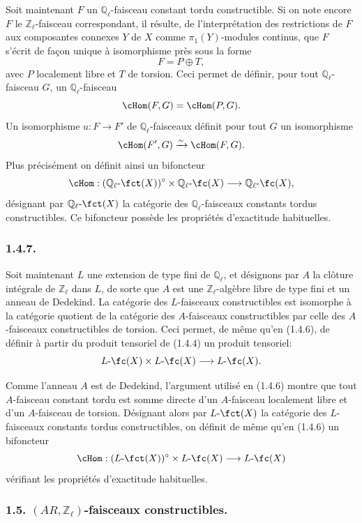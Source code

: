 Soit maintenant \(F\) un \(\mathbb{Q}_\ell\)-faisceau constant tordu constructible. Si on note encore \(F\) le \(\mathbb{Z}_\ell\)-faisceau correspondant, il résulte, de l'interprétation des restrictions de \(F\) aux composantes connexes \(Y\) de \(X\) comme \(\pi_1(Y)\)-modules continus, que \(F\) s'écrit de façon unique à isomorphisme près sous la forme
\[
F=P\oplus T,
\]
avec \(P\) localement libre et \(T\) de torsion. Ceci permet de définir, pour tout \(\mathbb{Q}_\ell\)-faisceau \(G\), un \(\mathbb{Q}_\ell\)-faisceau
\[
\cHom(F,G)=\cHom(P,G).
\]
Un isomorphisme \(u:F\to F'\) de \(\mathbb{Q}_\ell\)-faisceaux définit pour tout \(G\) un isomorphisme
\[
\cHom(F',G)\xrightarrow{\sim}\cHom(F,G).
\]
Plus précisément on définit ainsi un bifoncteur
\[
\cHom:(\mathbb{Q}_\ell\text{-}\fct(X))^\circ\times \mathbb{Q}_\ell\text{-}\fc(X)
\longrightarrow \mathbb{Q}_\ell\text{-}\fc(X),
\]
désignant par \(\mathbb{Q}_\ell\text{-}\fct(X)\) la catégorie des \(\mathbb{Q}_\ell\)-faisceaux constants tordus constructibles. Ce bifoncteur possède les propriétés d'exactitude habituelles.

\subsubsection*{1.4.7.}
Soit maintenant \(L\) une extension de type fini de \(\mathbb{Q}_\ell\), et désignons par \(A\) la clôture intégrale de \(\mathbb{Z}_\ell\) dans \(L\), de sorte que \(A\) est une \(\mathbb{Z}_\ell\)-algèbre libre de type fini et un anneau de Dedekind. La catégorie des \(L\)-faisceaux constructibles est isomorphe à la catégorie quotient de la catégorie des \(A\)-faisceaux constructibles par celle des \(A\)-faisceaux constructibles de torsion. Ceci permet, de même qu'en (1.4.6), de définir à partir du produit tensoriel de (1.4.4) un produit tensoriel:
\[
L\text{-}\fc(X)\times L\text{-}\fc(X)\longrightarrow L\text{-}\fc(X).
\]

Comme l'anneau \(A\) est de Dedekind, l'argument utilisé en (1.4.6) montre que tout \(A\)-faisceau constant tordu est somme directe d'un \(A\)-faisceau localement libre et d'un \(A\)-faisceau de torsion. Désignant alors par \(L\text{-}\fct(X)\) la catégorie des \(L\)-faisceaux constants tordus constructibles, on définit de même qu'en (1.4.6) un bifoncteur
\[
\cHom:(L\text{-}\fct(X))^\circ\times L\text{-}\fc(X)
\longrightarrow L\text{-}\fc(X)
\]
vérifiant les propriétés d'exactitude habituelles.

\subsubsection*{1.5. \((AR,\mathbb{Z}_\ell)\)-faisceaux constructibles.}

